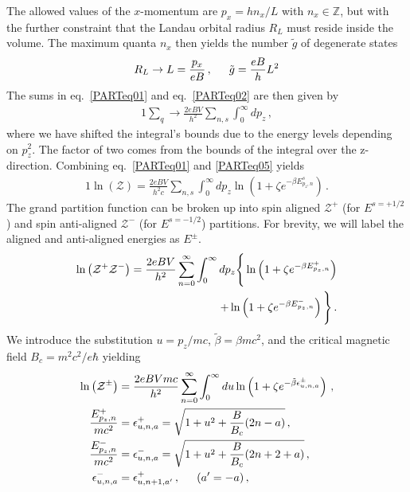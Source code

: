 \documentclass[
aps,
pra,
twocolumn,
showpacs,
preprintnumbers,
amsmath,
amssymb,
footinbib
]{revtex4-2}
\begin{document}
The allowed values of the $x$-momentum are $p_{x}=hn_{x}/L$ with $n_{x}\in\mathbb{Z}$, but with the further constraint that the Landau orbital radius $R_{L}$ must reside inside the volume. The maximum quanta $n_{x}$ then yields the number $\tilde{g}$ of degenerate states
\begin{alignat}{1}
  \label{PARTeq04} R_{L}\rightarrow L=\frac{p_{x}}{eB}\,,\indent \tilde{g}=\frac{eB}{h}L^{2}
\end{alignat}
The sums in eq.~\eqref{PARTeq01} and eq.~\eqref{PARTeq02} are then given by
\begin{alignat}{1}
  \label{PARTeq05} \sum_{q}\rightarrow\frac{2eBV}{h^{2}}\sum_{n,s}\int_{0}^{\infty}dp_{z}\,,
\end{alignat}
where we have shifted the integral's bounds due to the energy levels depending on $p_{z}^{2}$. The factor of two comes from the bounds of the integral over the z-direction. Combining eq.~\eqref{PARTeq01} and \eqref{PARTeq05} yields
\begin{alignat}{1}
  \label{PARTeq06} \ln\left(\mathcal{Z}\right)=\frac{2eBV}{h^{2}c}\sum_{n,s}\int_{0}^{\infty}dp_{z}\ln\left(1+\zeta e^{-\beta E^{s}_{p_{z},n}}\right)\,.
\end{alignat}
The grand partition function can be broken up into spin aligned $\mathcal{Z}^{+}$ (for $E^{s=+1/2}$) and spin anti-aligned $\mathcal{Z}^{-}$ (for $E^{s=-1/2}$) partitions. For brevity, we will label the aligned and anti-aligned energies as $E^{\pm}$.
\begin{alignat}{1}
  \notag \ln\left(\mathcal{Z}^{+}\mathcal{Z}^{-}\right)=\frac{2eBV}{h^{2}}\sum_{n=0}^{\infty}\int_{0}^{\infty}dp_{z}\Bigg\{\ln\left(1+\zeta e^{-\beta E^{+}_{p_{z},n}}\right)\\
  \label{PARTeq07} +\ln\left(1+\zeta e^{-\beta E^{-}_{p_{z},n}}\right)\Bigg\}\,.
\end{alignat}
We introduce the substitution $u=p_{z}/mc$, $\tilde{\beta}=\beta mc^{2}$, and the critical magnetic field $B_{c}=m^{2}c^{2}/e\hbar$ yielding
\begin{alignat}{1}
  \label{PARTeq08} \ln\left(\mathcal{Z}^{\pm}\right)&=\frac{2eBVmc}{h^{2}}\sum_{n=0}^{\infty}\int_{0}^{\infty}du\ln\left(1+\zeta e^{-\tilde{\beta}\epsilon^{\pm}_{u,n,a}}\right)\,,\\
 \label{PARTeq09} \frac{E^{+}_{p_{z},n}}{mc^{2}}&=\epsilon^{+}_{u,n,a}=\sqrt{1+u^{2}+\frac{B}{B_{c}}(2n-a)}\,,\\
 \label{PARTeq10} \frac{E^{-}_{p_{z},n}}{mc^{2}}&=\epsilon^{-}_{u,n,a}=\sqrt{1+u^{2}+\frac{B}{B_{c}}(2n+2+a)}\,,\\
 \label{PARTeq11} \epsilon^{-}_{u,n,a}&=\epsilon^{+}_{u,n+1,a'}\,,\indent (a'=-a)\,,
\end{alignat}
\end{document}
